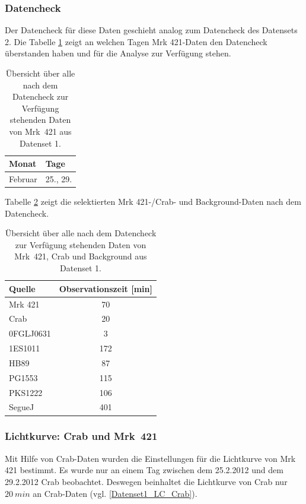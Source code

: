 \subsubsection{Datencheck}
Der Datencheck für diese Daten geschieht analog zum Datencheck des Datensets 2. 
Die Tabelle \ref{tab:Datenset1-Mrk421} zeigt an welchen Tagen Mrk 421-Daten den Datencheck überstanden haben und für die Analyse zur Verfügung stehen. 

\begin{table}[!h]
\centering
\caption{Übersicht über alle nach dem Datencheck zur Verfügung stehenden Daten von Mrk~421 aus Datenset 1.}
\label{tab:Datenset1-Mrk421}
\begin{tabular}{ll}
  \toprule
  Monat & Tage\\
  \midrule
  \midrule
Februar & 25., 29.\\
  \bottomrule
\end{tabular}
\end{table}


Tabelle \ref{tab:Datenset1} zeigt die selektierten Mrk 421-/Crab- und Background-Daten nach dem Datencheck.


\begin{table}[!h]
\centering
\caption{Übersicht über alle nach dem Datencheck zur Verfügung stehenden Daten von Mrk~421, Crab und Background aus Datenset 1.}
\label{tab:Datenset1}
\begin{tabular}{lc}
  \toprule
  Quelle & Observationszeit [min]\\
  \midrule
  \midrule
  Mrk 421 & 70\\
  \midrule
  Crab & 20\\
  \midrule
  0FGLJ0631 & 3 \\
  1ES1011 & 172 \\
  HB89 & 87 \\
  PG1553 & 115 \\
  PKS1222 & 106 \\
  SegueJ & 401 \\
  \bottomrule
\end{tabular}
\end{table}

\subsubsection{Lichtkurve: Crab und Mrk~421}
Mit Hilfe von Crab-Daten wurden die Einstellungen für die Lichtkurve von Mrk 421 bestimmt.
Es wurde nur an einem Tag zwischen dem 25.2.2012 und dem 29.2.2012 Crab beobachtet.
Deswegen beinhaltet die Lichtkurve von Crab nur $\SI{20}{min}$ an Crab-Daten (vgl. \autoref{Datenset1_LC_Crab}).

